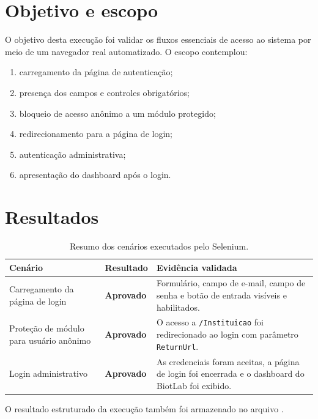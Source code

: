 \documentclass[12pt,a4paper]{article}
\newcommand{\aprovado}{\textcolor{successgreen}{\textbf{Aprovado}}}
\begin{document}
\section{Objetivo e escopo}

O objetivo desta execução foi validar os fluxos essenciais de acesso ao sistema
por meio de um navegador real automatizado. O escopo contemplou:

\begin{enumerate}[label=\arabic*.]
  \item carregamento da página de autenticação;
  \item presença dos campos e controles obrigatórios;
  \item bloqueio de acesso anônimo a um módulo protegido;
  \item redirecionamento para a página de login;
  \item autenticação administrativa;
  \item apresentação do dashboard após o login.
\end{enumerate}

\section{Resultados}

\renewcommand{\arraystretch}{1.35}
\begin{table}[H]
  \centering
  \small
  \begin{tabular}{p{4.2cm} p{2.2cm} p{7.2cm}}
    \toprule
    \textbf{Cenário} & \textbf{Resultado} & \textbf{Evidência validada} \\
    \midrule
    Carregamento da página de login
      & \aprovado
      & Formulário, campo de e-mail, campo de senha e botão de entrada visíveis e habilitados. \\
    Proteção de módulo para usuário anônimo
      & \aprovado
      & O acesso a \texttt{/Instituicao} foi redirecionado ao login com parâmetro \texttt{ReturnUrl}. \\
    Login administrativo
      & \aprovado
      & As credenciais foram aceitas, a página de login foi encerrada e o dashboard do BiotLab foi exibido. \\
    \bottomrule
  \end{tabular}
  \caption{Resumo dos cenários executados pelo Selenium.}
\end{table}

O resultado estruturado da execução também foi armazenado no arquivo
.
\end{document}
